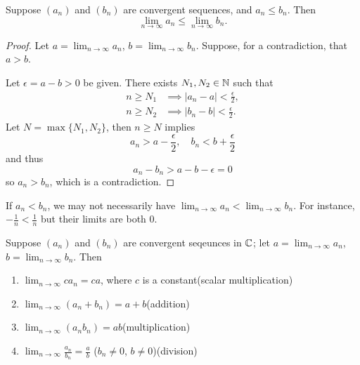 \begin{lemma}[Ordering]
Suppose $(a_n)$ and $(b_n)$ are convergent sequences, and $a_n \le b_n$. Then
\[\lim_{n\to\infty}a_n\le\lim_{n\to\infty}b_n.\]
\end{lemma}

\begin{proof}
Let $\displaystyle a=\lim_{n\to\infty}a_n$, $\displaystyle b=\lim_{n\to\infty}b_n$. Suppose, for a contradiction, that $a>b$.

Let $\epsilon=a-b>0$ be given. There exists $N_1,N_2\in\mathbb N$ such that
\begin{align*}
n\ge N_1&\implies|a_n-a|<\frac{\epsilon}{2},\\
n\ge N_2&\implies|b_n-b|<\frac{\epsilon}{2}.
\end{align*}
Let $N=\max\{N_1,N_2\}$, then $n\ge N$ implies
\[a_n>a-\frac{\epsilon}{2},\quad b_n<b+\frac{\epsilon}{2}\]
and thus
\[a_n-b_n>a-b-\epsilon=0\]
so $a_n>b_n$, which is a contradiction.
\end{proof}

\begin{remark}
If $a_n<b_n$, we may not necessarily have $\displaystyle\lim_{n\to\infty}a_n<\lim_{n\to\infty}b_n$. For instance, $-\frac{1}{n}<\frac{1}{n}$ but their limits are both $0$.
\end{remark}

\begin{lemma}\label{lemma:arithmetic-properties-limit-sequences}
Suppose $(a_n)$ and $(b_n)$ are convergent seqeunces in $\mathbb C$; let $\displaystyle a=\lim_{n\to\infty}a_n$, $\displaystyle b=\lim_{n\to\infty}b_n$. Then
\begin{enumerate}[label=(\roman*)]
\item $\displaystyle\lim_{n\to\infty}ca_n=ca$, where $c$ is a constant\hfill(scalar multiplication)
\item $\displaystyle\lim_{n\to\infty}(a_n+b_n)=a+b$\hfill(addition)
\item $\displaystyle\lim_{n\to\infty}(a_n b_n)=ab$\hfill(multiplication)
\item $\displaystyle\lim_{n\to\infty}\frac{a_n}{b_n}=\frac{a}{b}$ ($b_n\neq0$, $b\neq0$)\hfill(division)
\end{enumerate}
\end{lemma}

